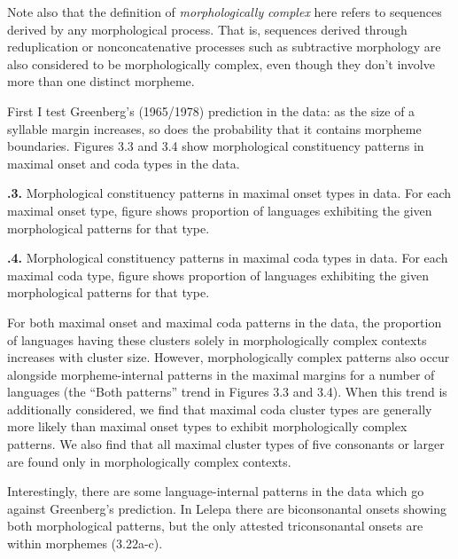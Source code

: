 \z


  Note also that the definition of \textit{morphologically} \textit{complex} here refers to sequences derived by any morphological process. That is, sequences derived through reduplication or nonconcatenative processes such as subtractive morphology are also considered to be morphologically complex, even though they don’t involve more than one distinct morpheme.



  First I test Greenberg’s (1965/1978) prediction in the data: as the size of a syllable margin increases, so does the probability that it contains morpheme boundaries. Figures 3.3 and 3.4 show morphological constituency patterns in maximal onset and coda types in the data.





\textbf{.3.} Morphological constituency patterns in maximal onset types in data. For each maximal onset type, figure shows proportion of languages exhibiting the given morphological patterns for that type.





\textbf{.4.} Morphological constituency patterns in maximal coda types in data. For each maximal coda type, figure shows proportion of languages exhibiting the given morphological patterns for that type.



  For both maximal onset and maximal coda patterns in the data, the proportion of languages having these clusters solely in morphologically complex contexts increases with cluster size. However, morphologically complex patterns also occur alongside morpheme-internal patterns in the maximal margins for a number of languages (the “Both patterns” trend in Figures 3.3 and 3.4). When this trend is additionally considered, we find that maximal coda cluster types are generally more likely than maximal onset types to exhibit morphologically complex patterns. We also find that all maximal cluster types of five consonants or larger are found only in morphologically complex contexts.



  Interestingly, there are some language-internal patterns in the data which go against Greenberg’s prediction. In Lelepa there are biconsonantal onsets showing both morphological patterns, but the only attested triconsonantal onsets are within morphemes (3.22a-c).



